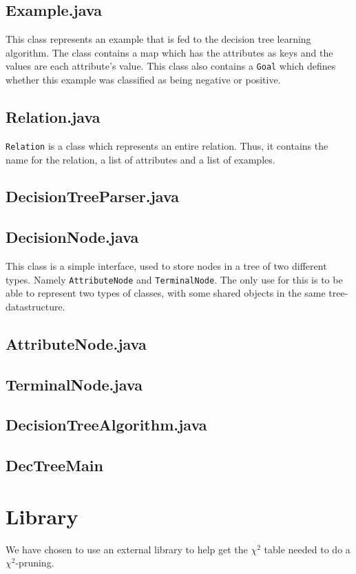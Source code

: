 \documentclass[a4paper]{article}
\begin{document}
\subsection{Example.java}
This class represents an example that is fed to the decision tree learning algorithm. The class contains a map which has the attributes as keys and the values are each attribute's value. This class also contains a \texttt{Goal} which defines whether this example was classified as being negative or positive.
\subsection{Relation.java}
\texttt{Relation} is a class which represents an entire relation. Thus, it contains the name for the relation, a list of attributes and a list of examples.
\subsection{DecisionTreeParser.java}
\subsection{DecisionNode.java}
This class is a simple interface, used to store nodes in a tree of two different types. Namely \texttt{AttributeNode} and \texttt{TerminalNode}. The only use for this is to be able to represent two types of classes, with some shared objects in the same tree-datastructure.
\subsection{AttributeNode.java}
\subsection{TerminalNode.java}
\subsection{DecisionTreeAlgorithm.java}
\subsection{DecTreeMain}

\section{Library}
We have chosen to use an external library to help get the $\chi^{2}$ table needed to do a $\chi^{2}$-pruning. 
\end{document}
